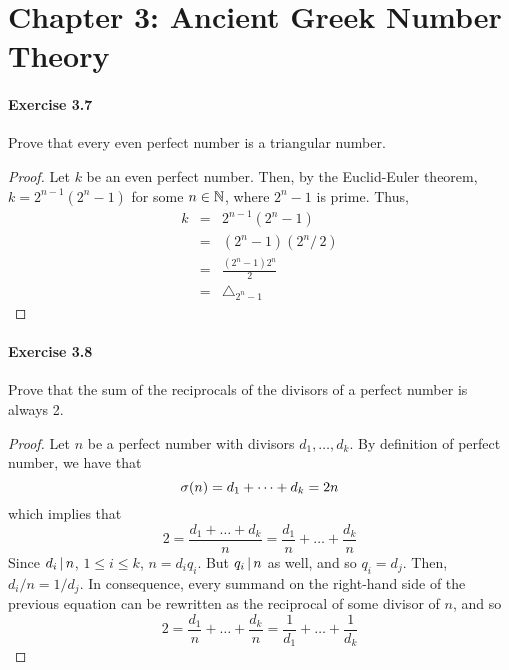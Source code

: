 \section*{Chapter 3: Ancient Greek Number Theory}

\paragraph{Exercise 3.7}
Prove that every even perfect number is a triangular number.

\begin{proof}
Let $k$ be an even perfect number. Then, by the Euclid-Euler theorem,
$k = 2^{n-1} (2^n - 1)$ for some $n \in \mathbb{N}$, where $2^n - 1$ is prime.
Thus,
\begin{eqnarray*}
k &=& 2^{n-1} (2^n - 1)\\
  &=& (2^n - 1) (2^n / \, 2) \\
  &=& \frac{(2^n - 1) 2^n}{2} \\
  &=& \triangle_{2^n - 1}
\end{eqnarray*}

\end{proof}


\paragraph{Exercise 3.8}
Prove that the sum of the reciprocals of the divisors of a perfect number is
always 2.

\begin{proof}
Let $n$ be a perfect number with divisors $d_1,\dots,d_k$. By definition of
perfect number, we have that
$$\sigma(n) = d_1 + \dots + d_k = 2n$$
which implies that 
$$2 = \frac{d_1 + \dots + d_k}{n} = \frac{d_1}{n} + \dots + \frac{d_k}{n}$$
Since $d_i \, | \, n$, $1 \leq i \leq k$, $n = d_i q_i$. But
$q_i \, | \, n$ as well, and so $q_i = d_j$. Then, $d_i / n = 1 / d_j$.
In consequence, every summand on the right-hand side of the previous equation
can be rewritten as the reciprocal of some divisor of $n$, and so
$$2 = \frac{d_1}{n} + \dots + \frac{d_k}{n} = \frac{1}{d_1} + \dots + \frac{1}{d_k}$$

\end{proof}
